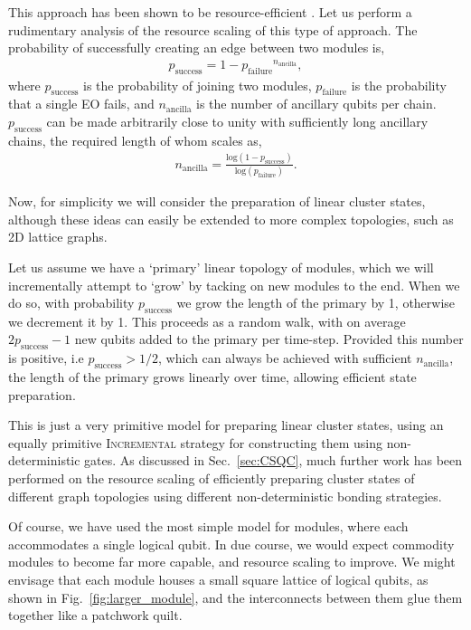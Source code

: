 \documentclass[aps,rmp,twocolumn,amsmath,amssymb,nofootinbib,superscriptaddress,longbibliography,floatfix,table-of-contents,eqsecnum]{revtex4-1}
\begin{document}
This approach has been shown to be resource-efficient \cite{bib:YoranReznik03, bib:Nielsen04}. Let us perform a rudimentary analysis of the resource scaling of this type of approach. The probability of successfully creating an edge between two modules is,
\begin{align}
p_\text{success} = 1 - {p_\text{failure}}^{n_\text{ancilla}},
\end{align}
where $p_\text{success}$ is the probability of joining two modules, $p_\text{failure}$ is the probability that a single EO fails, and $n_\text{ancilla}$ is the number of ancillary qubits per chain. $p_\text{success}$ can be made arbitrarily close to unity with sufficiently long ancillary chains, the required length of whom scales as,
\begin{align}
n_\text{ancilla} = \frac{\text{log}(1-p_\text{success})}{\text{log}(p_\text{failure})}.
\end{align}

Now, for simplicity we will consider the preparation of linear cluster states, although these ideas can easily be extended to more complex topologies, such as 2D lattice graphs.

Let us assume we have a `primary' linear topology of modules, which we will incrementally attempt to `grow' by tacking on new modules to the end. When we do so, with probability $p_\text{success}$ we grow the length of the primary by 1, otherwise we decrement it by 1. This proceeds as a random walk, with on average \mbox{$2p_\text{success}-1$} new qubits added to the primary per time-step. Provided this number is positive, i.e \mbox{$p_\text{success}>1/2$}, which can always be achieved with sufficient $n_\text{ancilla}$, the length of the primary grows linearly over time, allowing efficient state preparation.

This is just a very primitive model for preparing linear cluster states, using an equally primitive \textsc{Incremental} strategy for constructing them using non-deterministic gates. As discussed in Sec.~\ref{sec:CSQC}, much further work has been performed on the resource scaling of efficiently preparing cluster states of different graph topologies using different non-deterministic bonding strategies.

Of course, we have used the most simple model for modules, where each accommodates a single logical qubit. In due course, we would expect commodity modules to become far more capable, and resource scaling to improve. We might envisage that each module houses a small square lattice of logical qubits, as shown in Fig.~\ref{fig:larger_module}, and the interconnects between them glue them together like a patchwork quilt.
\end{document}
